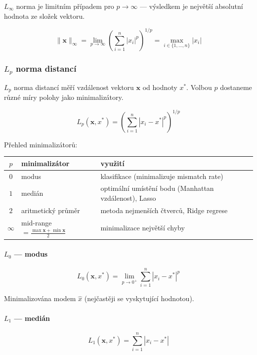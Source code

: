 \documentclass[a4paper, 11pt]{article}
\begin{document}
$L_\infty$ norma je limitním případem pro $p \to \infty$ --- výsledkem je největší absolutní hodnota ze složek vektoru.

\begin{equation*}
	\|\mathbf{x}\|_\infty = \lim_{p \to \infty} \left(\sum_{i=1}^{n} |x_i|^p\right)^{1/p} = \max_{i \in \{1,\ldots,n\}} |x_i|
\end{equation*}

\subsubsection{$L_p$ norma distancí}

$L_p$ norma distancí měří vzdálenost vektoru $\mathbf{x}$ od hodnoty $x^*$.
Volbou $p$ dostaneme různé míry polohy jako minimalizátory.

\begin{equation*}
	L_p(\mathbf{x}, x^*) = \left(\sum_{i=1}^{n} |x_i - x^*|^p\right)^{1/p}
\end{equation*}

Přehled minimalizátorů:

\begin{center}
\renewcommand{\arraystretch}{1.3}
\begin{tabular}{cll}
	\toprule
	$p$ & minimalizátor & využití \\
	\midrule
	$0$ & modus & klasifikace (minimalizuje mismatch rate) \\
	$1$ & medián & optimální umístění bodu (Manhattan vzdálenost), Lasso \\
	$2$ & aritmetický průměr & metoda nejmenších čtverců, Ridge regrese \\
	$\infty$ & mid-range $= \tfrac{\max \mathbf{x} + \min \mathbf{x}}{2}$ & minimalizace největší chyby \\
	\bottomrule
\end{tabular}
\end{center}

\paragraph{$L_0$ — modus}\mbox{}\par
\begin{equation*}
	L_0(\mathbf{x}, x^*) = \lim_{p \to 0^+} \sum_{i=1}^{n} |x_i - x^*|^p
\end{equation*}

Minimalizována modem $\hat{x}$ (nejčastěji se vyskytující hodnotou).

\paragraph{$L_1$ — medián}\mbox{}\par
\begin{equation*}
	L_1(\mathbf{x}, x^*) = \sum_{i=1}^{n} |x_i - x^*|
\end{equation*}
\end{document}
